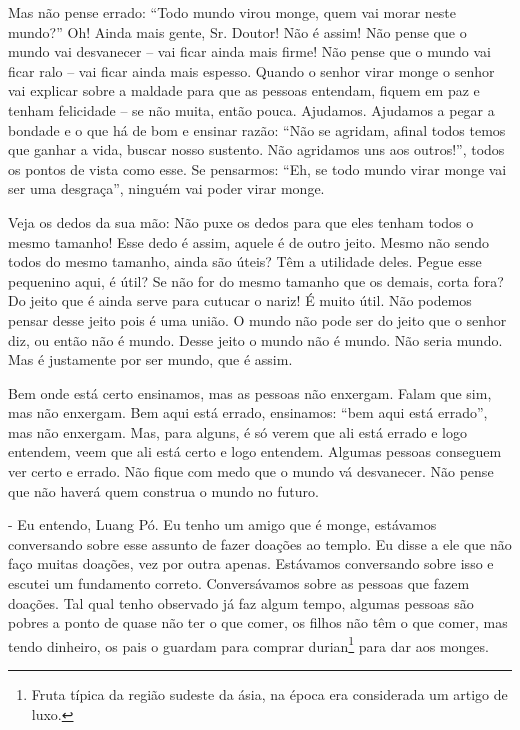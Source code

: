 Mas não pense errado: “Todo mundo virou monge, quem vai morar neste
mundo?” Oh! Ainda mais gente, Sr. Doutor! Não é assim! Não pense que o
mundo vai desvanecer – vai ficar ainda mais firme! Não pense que o
mundo vai ficar ralo – vai ficar ainda mais espesso. Quando o senhor
virar monge o senhor vai explicar sobre a maldade para que as pessoas
entendam, fiquem em paz e tenham felicidade – se não muita, então
pouca. Ajudamos. Ajudamos a pegar a bondade e o que há de bom e ensinar
razão: “Não se agridam, afinal todos temos que ganhar a vida, buscar
nosso sustento. Não agridamos uns aos outros!”, todos os pontos de
vista como esse. Se pensarmos: “Eh, se todo mundo virar monge vai ser
uma desgraça”, ninguém vai poder virar monge. 

Veja os dedos da sua mão: Não puxe os dedos para que eles tenham
todos o mesmo tamanho! Esse dedo é assim, aquele é de outro jeito.
Mesmo não sendo todos do mesmo tamanho, ainda são úteis? Têm a
utilidade deles. Pegue esse pequenino aqui, é útil? Se não for do mesmo
tamanho que os demais, corta fora? Do jeito que é ainda serve para
cutucar o nariz! É muito útil. Não podemos pensar desse jeito pois é
uma união. O mundo não pode ser do jeito que o senhor diz, ou então não
é mundo. Desse jeito o mundo não é mundo. Não seria mundo. Mas é
justamente por ser mundo, que é assim. 

Bem onde está certo ensinamos, mas as pessoas não enxergam. Falam
que sim, mas não enxergam. Bem aqui está errado, ensinamos: “bem aqui
está errado”, mas não enxergam. Mas, para alguns, é só verem que ali
está errado e logo entendem, veem que ali está certo e logo entendem.
Algumas pessoas conseguem ver certo e errado. Não fique com medo que o
mundo vá desvanecer. Não pense que não haverá quem construa o mundo no
futuro.

{}- Eu entendo, Luang Pó. Eu tenho um amigo que é monge, estávamos
conversando sobre esse assunto de fazer doações ao templo. Eu disse a
ele que não faço muitas doações, vez por outra apenas. Estávamos
conversando sobre isso e escutei um fundamento correto. Conversávamos
sobre as pessoas que fazem doações. Tal qual tenho observado já faz
algum tempo, algumas pessoas são pobres a ponto de quase não ter o que
comer, os filhos não têm o que comer, mas tendo dinheiro, os pais o
guardam para comprar durian\footnote{Fruta típica da região sudeste da
ásia, na época era considerada um artigo de luxo.} para dar aos monges.

